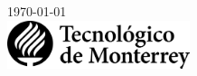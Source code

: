 \documentclass{article}
\begin{document}
\begin{titlepage}


    {\large \today}\\[2cm] %


    \includegraphics[width=0.4\textwidth,height=\textheight,keepaspectratio]{../Assets/logo-tec-negro.png} %


    \vfill %

\end{titlepage}
\end{document}
